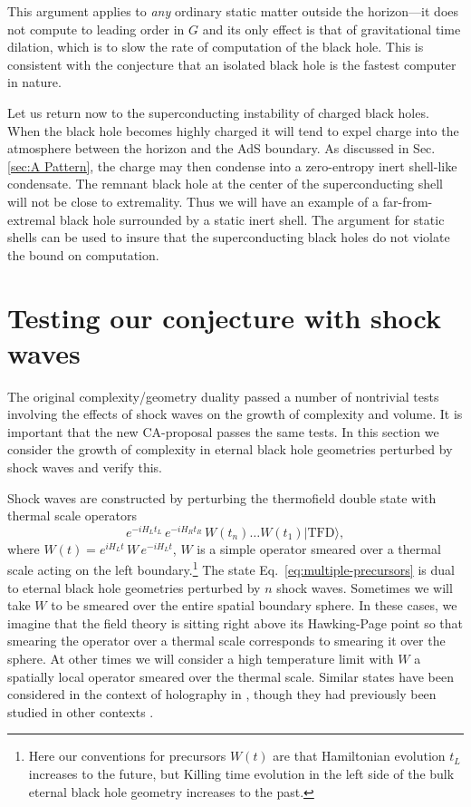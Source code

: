 \documentclass[12pt]{article}
\numberwithin{equation}{section}
\newcommand{\be}{\begin{equation}}
\newcommand{\ee}{\end{equation}}
\newcommand{\TFD}{|\text{TFD}\rangle}
\renewcommand{\eqref}[1]{Eq.~\ref{#1}}
\begin{document}
This argument applies to \emph{any} ordinary static matter outside the horizon---it does not compute to leading  order in $G$ and its only effect is that of gravitational time dilation, which is to slow the rate of computation of the black hole. This is consistent with the conjecture that an isolated  black hole is the fastest computer in nature.

Let us return now to the superconducting instability of charged black holes.
When the black hole becomes highly charged it will tend to expel charge into the atmosphere between the horizon and the AdS boundary. As discussed in Sec.\ref{sec:A Pattern}, the charge may then condense into a zero-entropy inert shell-like condensate. The remnant black hole at the center of the superconducting shell will not be close to extremality. Thus we will have an example of a far-from-extremal black hole surrounded by a static inert shell. The argument for static shells can be used to insure that the superconducting black holes do not violate the bound on computation.




\section{Testing our conjecture with shock waves}
\label{sec:shockwaves}

The original complexity/geometry duality passed a number of nontrivial tests involving the effects of shock waves on the growth of complexity and volume. It is important that the new CA-proposal passes the same tests.
In this section we consider the growth of complexity in eternal black hole geometries perturbed by shock waves and verify this.

Shock waves are constructed by perturbing the thermofield double state with thermal scale operators
\be
e^{-i H_L t_L}\, e^{-i H_R t_R}\, W(t_{n}) \dots W(t_1) \TFD, \label{eq:multiple-precursors}
\ee
where $W(t) = e^{i H_L t}\, W\, e^{-i H_L t}$, $W$ is a simple operator smeared over a thermal scale acting on the left boundary.\footnote{Here our conventions for precursors $W(t)$ are that Hamiltonian evolution $t_L$ increases to the future, but Killing time evolution in the left side of the bulk eternal black hole geometry increases to the past.} The state \eqref{eq:multiple-precursors} is dual to eternal black hole geometries perturbed by $n$ shock waves. Sometimes we will take $W$ to be smeared over the entire spatial boundary sphere. In these cases, we imagine that the field theory is sitting right above its Hawking-Page point so that smearing the operator over a thermal scale corresponds to smearing it over the sphere. At other times we will consider a high temperature limit with $W$ a spatially local operator smeared over the thermal scale. Similar states have been considered in the context of holography in \cite{shock,Shenker:2013yza,Leichenauer:2014nxa,localshocks,Shenker:2014cwa}, though they had previously been studied in other contexts \cite{Dray:1984ha,Dray:1985yt,Sfetsos:1994xa}.
\end{document}
